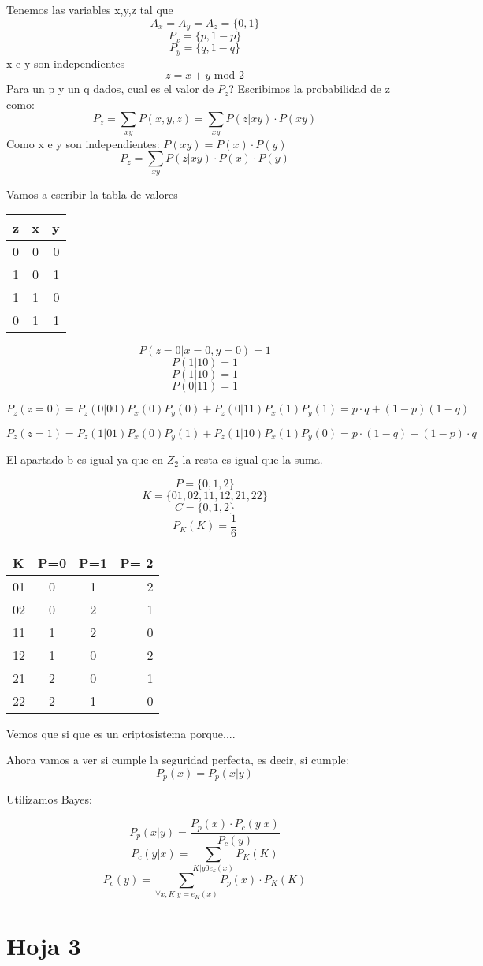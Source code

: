 \begin{problem}
	Tenemos las variables x,y,z tal que 
	$$A_x = A_y = A_z = \{0,1\}$$
	$$P_x = \{p, 1-p\}$$
	$$P_y = \{q, 1-q\}$$
	x e y son independientes
	$$z = x+y \text{ mod 2}$$
	Para un p y un q dados, cual es el valor de $P_z$?
	\solution
	Escribimos la probabilidad de z como:
	$$P_z = \sum_{xy} P(x,y,z) = \sum_{xy} P(z|xy)\cdot P(xy)$$
	Como x e y son independientes: $P(xy) = P(x)\cdot P(y)$
	$$P_z = \sum_{xy} P(z|xy)\cdot P(x)\cdot P(y)$$
	
	Vamos a escribir la tabla de valores
	\begin{center}
		
	
	\begin{tabular}{l | c | r}
	z & x & y\\
	\hline
	0 & 0 & 0\\
	1 & 0 & 1\\
	1 & 1 & 0\\
	0 & 1 & 1
	\end{tabular}
	
\end{center}

$$P(z = 0 | x= 0 , y = 0) = 1$$
$$P(1|1 0) = 1$$
$$P(1|10) = 1$$
$$P(0 |11) = 1$$

$$P_z(z=0) = P_z(0|00)P_x(0)P_y(0) + P_z(0|11)P_x(1)P_y(1) = p\cdot q + (1-p)(1-q)$$

$$P_z(z=1) = P_z(1|01)P_x(0)P_y(1) + P_z(1|10)P_x(1)P_y(0) = p\cdot (1-q) + (1-p)\cdot q$$

El apartado b es igual ya que en $Z_2$ la resta es igual que la suma.
\end{problem}

\begin{problem}[13]
	$$ P = \{0,1,2\}$$
	$$ K = \{ 01, 02 , 11 , 12 , 21 , 22 \}$$
	$$C = \{0,1,2\}$$
	$$P_K(K) = \frac{1}{6}$$
	\begin{center}
		\begin{tabular}{l | c c r}
			 K & P=0 & P=1 & P= 2\\
			 \hline
			 01 & 0 & 1 & 2\\
			 02 & 0 & 2 & 1\\
			 11 & 1 & 2 & 0\\
			 12 & 1 & 0 & 2\\
			 21 & 2 & 0 & 1\\
			 22 & 2 & 1 & 0
		\end{tabular}
	\end{center}
	\solution
	Vemos que si que es un criptosistema porque....
	
	Ahora vamos a ver si cumple la seguridad perfecta, es decir, si cumple:
	$$P_p(x) = P_p(x|y)$$
	
	Utilizamos Bayes:
	
	$$P_p(x|y) = \frac{P_p(x) \cdot P_c(y|x)}{P_c(y)}$$
	$$P_c(y|x) = \sum_{K|y 0 e_k(x)}P_K(K)$$
	$$P_c(y) = \sum_{\forall x, K|y = e_K(x)} P_p(x) \cdot P_K(K)$$
\end{problem}
\section{Hoja 3}